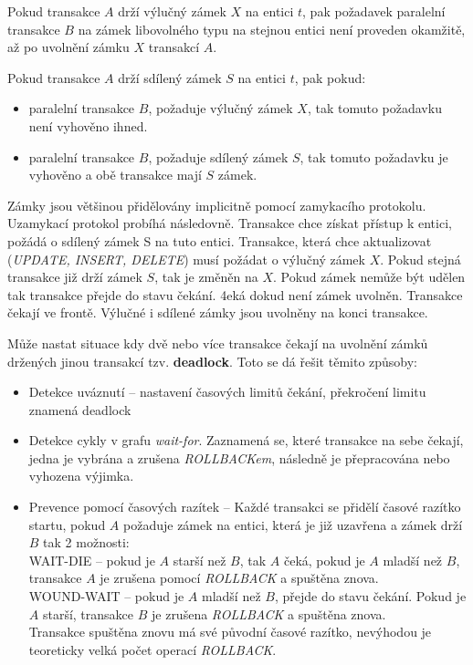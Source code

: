 Pokud transakce $A$ drží výlučný zámek $X$ na entici $t$, pak požadavek paralelní transakce $B$ na zámek libovolného typu na stejnou entici není proveden okamžitě, až po uvolnění zámku $X$ transakcí $A$.

Pokud transakce $A$ drží sdílený zámek $S$ na entici $t$, pak pokud:
\begin{itemize}
\item paralelní transakce $B$, požaduje výlučný zámek $X$, tak tomuto požadavku není vyhověno ihned.
\item paralelní transakce $B$, požaduje sdílený zámek $S$, tak tomuto požadavku je vyhověno a obě transakce mají $S$ zámek.
\end{itemize}

Zámky jsou většinou přidělovány implicitně pomocí zamykacího protokolu. Uzamykací protokol probíhá následovně. Transakce chce získat přístup k entici, požádá o sdílený zámek S na tuto entici. Transakce, která chce aktualizovat (\textit{UPDATE, INSERT, DELETE}) musí požádat o výlučný zámek $X$.  Pokud stejná transakce již drží zámek $S$, tak je změněn na $X$. Pokud zámek nemůže být udělen tak transakce přejde do stavu čekání. 4eká dokud není zámek uvolněn. Transakce čekají ve frontě. Výlučné i sdílené zámky jsou uvolněny na konci transakce.

Může nastat situace kdy dvě nebo více transakce čekají na uvolnění zámků držených jinou transakcí tzv. \textbf{deadlock}. Toto se dá řešit těmito způsoby:
\begin{itemize}
\item Detekce uváznutí -- nastavení časových limitů čekání, překročení limitu znamená deadlock
\item Detekce cykly v grafu \textit{wait-for}. Zaznamená se, které transakce na sebe čekají, jedna je vybrána a zrušena \textit{ROLLBACKem}, následně je přepracována nebo vyhozena výjimka.
\item Prevence pomocí časových razítek -- Každé transakci se přidělí časové razítko startu, pokud $A$ požaduje zámek na entici, která je již uzavřena a zámek drží $B$ tak 2 možnosti:\\
WAIT-DIE – pokud je $A$ starší než $B$, tak $A$ čeká, pokud je $A$ mladší než $B$, transakce $A$ je zrušena pomocí \textit{ROLLBACK} a spuštěna znova.\\
WOUND-WAIT – pokud je $A$ mladší než $B$, přejde do stavu čekání. Pokud je $A$ starší, transakce $B$ je zrušena \textit{ROLLBACK} a spuštěna znova.\\
Transakce spuštěna znovu má své původní časové razítko, nevýhodou je teoreticky velká počet operací \textit{ROLLBACK}.
\end{itemize}

